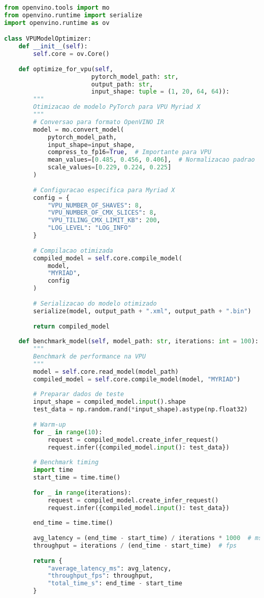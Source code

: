 \begin{lstlisting}[language=Python]
from openvino.tools import mo
from openvino.runtime import serialize
import openvino.runtime as ov

class VPUModelOptimizer:
    def __init__(self):
        self.core = ov.Core()
    
    def optimize_for_vpu(self, 
                        pytorch_model_path: str, 
                        output_path: str,
                        input_shape: tuple = (1, 20, 64, 64)):
        """
        Otimizacao de modelo PyTorch para VPU Myriad X
        """
        # Conversao para formato OpenVINO IR
        model = mo.convert_model(
            pytorch_model_path,
            input_shape=input_shape,
            compress_to_fp16=True,  # Importante para VPU
            mean_values=[0.485, 0.456, 0.406],  # Normalizacao padrao
            scale_values=[0.229, 0.224, 0.225]
        )
        
        # Configuracao especifica para Myriad X
        config = {
            "VPU_NUMBER_OF_SHAVES": 8,
            "VPU_NUMBER_OF_CMX_SLICES": 8,
            "VPU_TILING_CMX_LIMIT_KB": 200,
            "LOG_LEVEL": "LOG_INFO"
        }
        
        # Compilacao otimizada
        compiled_model = self.core.compile_model(
            model, 
            "MYRIAD", 
            config
        )
        
        # Serializacao do modelo otimizado
        serialize(model, output_path + ".xml", output_path + ".bin")
        
        return compiled_model
    
    def benchmark_model(self, model_path: str, iterations: int = 100):
        """
        Benchmark de performance na VPU
        """
        model = self.core.read_model(model_path)
        compiled_model = self.core.compile_model(model, "MYRIAD")
        
        # Preparar dados de teste
        input_shape = compiled_model.input().shape
        test_data = np.random.rand(*input_shape).astype(np.float32)
        
        # Warm-up
        for _ in range(10):
            request = compiled_model.create_infer_request()
            request.infer({compiled_model.input(): test_data})
        
        # Benchmark timing
        import time
        start_time = time.time()
        
        for _ in range(iterations):
            request = compiled_model.create_infer_request()
            request.infer({compiled_model.input(): test_data})
        
        end_time = time.time()
        
        avg_latency = (end_time - start_time) / iterations * 1000  # ms
        throughput = iterations / (end_time - start_time)  # fps
        
        return {
            "average_latency_ms": avg_latency,
            "throughput_fps": throughput,
            "total_time_s": end_time - start_time
        }
\end{lstlisting}

